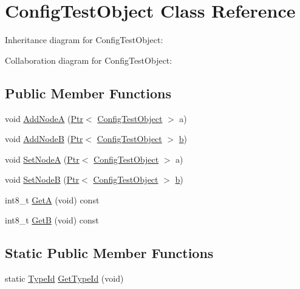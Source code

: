 \hypertarget{classConfigTestObject}{}\section{Config\+Test\+Object Class Reference}
\label{classConfigTestObject}


Inheritance diagram for Config\+Test\+Object\+:


Collaboration diagram for Config\+Test\+Object\+:
\subsection*{Public Member Functions}
\begin{DoxyCompactItemize}
\item 
void \hyperlink{classConfigTestObject_a15bab231400d1c02d5fa91bcb5d1cecd}{Add\+NodeA} (\hyperlink{classns3_1_1Ptr}{Ptr}$<$ \hyperlink{classConfigTestObject}{Config\+Test\+Object} $>$ a)
\item 
void \hyperlink{classConfigTestObject_a288533076f98c4ef77ca2181294b0f32}{Add\+NodeB} (\hyperlink{classns3_1_1Ptr}{Ptr}$<$ \hyperlink{classConfigTestObject}{Config\+Test\+Object} $>$ \hyperlink{lte__pathloss_8m_a21ad0bd836b90d08f4cf640b4c298e7c}{b})
\item 
void \hyperlink{classConfigTestObject_aa1f3fc0f4e345021d93d6f3704eae58a}{Set\+NodeA} (\hyperlink{classns3_1_1Ptr}{Ptr}$<$ \hyperlink{classConfigTestObject}{Config\+Test\+Object} $>$ a)
\item 
void \hyperlink{classConfigTestObject_a4bbf3c248c741e2f0840c3db3a88ad5c}{Set\+NodeB} (\hyperlink{classns3_1_1Ptr}{Ptr}$<$ \hyperlink{classConfigTestObject}{Config\+Test\+Object} $>$ \hyperlink{lte__pathloss_8m_a21ad0bd836b90d08f4cf640b4c298e7c}{b})
\item 
int8\+\_\+t \hyperlink{classConfigTestObject_aa35d8aea7daa7bb2f991b23d1c2a1df0}{GetA} (void) const 
\item 
int8\+\_\+t \hyperlink{classConfigTestObject_a931d2daef1b4b2bd89def97ab1847706}{GetB} (void) const 
\end{DoxyCompactItemize}
\subsection*{Static Public Member Functions}
\begin{DoxyCompactItemize}
\item 
static \hyperlink{classns3_1_1TypeId}{Type\+Id} \hyperlink{classConfigTestObject_a931dcf86abddf44e4645f889eaf6abac}{Get\+Type\+Id} (void)
\end{DoxyCompactItemize}
